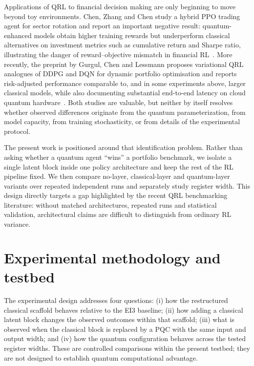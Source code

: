 \documentclass[aps,floatfix,superscriptaddress,twocolumn,tightenlines,amsmath,amssymb,nofootinbib,10pt,longbibliography,prl]{revtex4-2}
\begin{document}
Applications of QRL to financial decision making are only beginning to move beyond toy environments. Chen, Zhang and Chen study a hybrid PPO trading agent for sector rotation and report an important negative result: quantum-enhanced models obtain higher training rewards but underperform classical alternatives on investment metrics such as cumulative return and Sharpe ratio, illustrating the danger of reward--objective mismatch in financial RL~\cite{chen2025quantumreinforcementlearningtrading}. More recently, the preprint by Gurgul, Chen and Lessmann proposes variational QRL analogues of DDPG and DQN for dynamic portfolio optimisation and reports risk-adjusted performance comparable to, and in some experiments above, larger classical models, while also documenting substantial end-to-end latency on cloud quantum hardware~\cite{Gurgul2026QRLPortfolio}. Both studies are valuable, but neither by itself resolves whether observed differences originate from the quantum parameterization, from model capacity, from training stochasticity, or from details of the experimental protocol.

The present work is positioned around that identification problem. Rather than asking whether a quantum agent ``wins'' a portfolio benchmark, we isolate a single latent block inside one policy architecture and keep the rest of the RL pipeline fixed. We then compare no-layer, classical-layer and quantum-layer variants over repeated independent runs and separately study register width. This design directly targets a gap highlighted by the recent QRL benchmarking literature: without matched architectures, repeated runs and statistical validation, architectural claims are difficult to distinguish from ordinary RL variance.

\section{Experimental methodology and testbed}
\label{sec:testbed}

The experimental design addresses four questions: (i) how the restructured classical scaffold behaves relative to the EI3 baseline; (ii) how adding a classical latent block changes the observed outcomes within that scaffold; (iii) what is observed when the classical block is replaced by a PQC with the same input and output width; and (iv) how the quantum configuration behaves across the tested register widths. These are controlled comparisons within the present testbed; they are not designed to establish quantum computational advantage.
\end{document}

